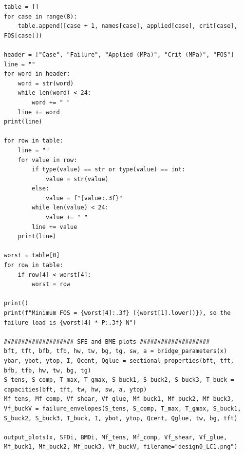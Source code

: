 \begin{verbatim}
table = []
for case in range(8):
    table.append([case + 1, names[case], applied[case], crit[case], FOS[case]])

header = ["Case", "Failure", "Applied (MPa)", "Crit (MPa)", "FOS"]
line = ""
for word in header:
    word = str(word)
    while len(word) < 24:
        word += " "
    line += word
print(line)

for row in table:
    line = ""
    for value in row:
        if type(value) == str or type(value) == int:
            value = str(value)
        else:
            value = f"{value:.3f}"
        while len(value) < 24:
            value += " "
        line += value
    print(line)

worst = table[0]
for row in table:
    if row[4] < worst[4]:
        worst = row

print()
print(f"Minimum FOS = {worst[4]:.3f} ({worst[1].lower()}), so the failure load is {worst[4] * P:.3f} N")

#################### SFE and BME plots ####################
bft, tft, bfb, tfb, hw, tw, bg, tg, sw, a = bridge_parameters(x)
ybar, ybot, ytop, I, Qcent, Qglue = sectional_properties(bft, tft, bfb, tfb, hw, tw, bg, tg)
S_tens, S_comp, T_max, T_gmax, S_buck1, S_buck2, S_buck3, T_buck = capacities(bft, tft, tw, hw, sw, a, ytop)
Mf_tens, Mf_comp, Vf_shear, Vf_glue, Mf_buck1, Mf_buck2, Mf_buck3, Vf_buckV = failure_envelopes(S_tens, S_comp, T_max, T_gmax, S_buck1, S_buck2, S_buck3, T_buck, I, ybot, ytop, Qcent, Qglue, tw, bg, tft)

output_plots(x, SFDi, BMDi, Mf_tens, Mf_comp, Vf_shear, Vf_glue, Mf_buck1, Mf_buck2, Mf_buck3, Vf_buckV, filename="design0_LC1.png")
\end{verbatim}